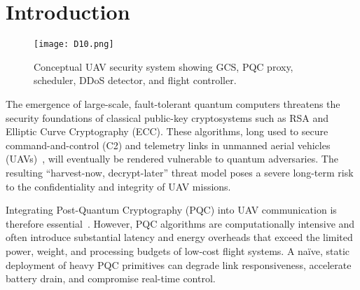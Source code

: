 \documentclass[sigconf,natbib=false]{acmart}
\begin{document}




\maketitle

\section{Introduction}

\begin{figure}[h]
  \centering
  \texttt{[image: D10.png]}
  \caption{Conceptual UAV security system showing GCS, PQC proxy, scheduler, DDoS detector, and flight controller.}
  \label{fig:intro_system}
\end{figure}

The emergence of large-scale, fault-tolerant quantum computers threatens the security foundations of classical public-key cryptosystems such as RSA and Elliptic Curve Cryptography (ECC). These algorithms, long used to secure command-and-control (C2) and telemetry links in unmanned aerial vehicles (UAVs)~\cite{meier2011pixhawk,mavlink_signing_mavlinkio}, will eventually be rendered vulnerable to quantum adversaries. The resulting ``harvest-now, decrypt-later'' threat model poses a severe long-term risk to the confidentiality and integrity of UAV missions.

Integrating Post-Quantum Cryptography (PQC) into UAV communication is therefore essential~\cite{nist_pqc_news_2024}. However, PQC algorithms are computationally intensive and often introduce substantial latency and energy overheads that exceed the limited power, weight, and processing budgets of low-cost flight systems. A naïve, static deployment of heavy PQC primitives can degrade link responsiveness, accelerate battery drain, and compromise real-time control.
\end{document}
